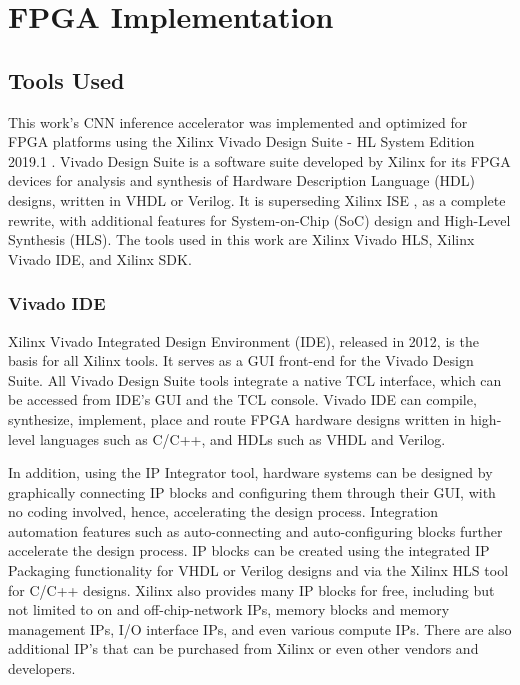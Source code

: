 \chapter{FPGA Implementation}
\label{Chapter-FPGA-Implementation}

\section{Tools Used}
This work's CNN inference accelerator was implemented and optimized for FPGA platforms using the Xilinx Vivado Design Suite - HL System Edition 2019.1 \cite{Vivado-Design-Suite}. Vivado Design Suite is a software suite developed by Xilinx for its FPGA devices for analysis and synthesis of Hardware Description Language (HDL) designs, written in VHDL or Verilog. It is superseding Xilinx ISE \cite{Xilinx-ISE}, as a complete rewrite, with additional features for System-on-Chip (SoC) design and High-Level Synthesis (HLS). The tools used in this work are Xilinx Vivado HLS, Xilinx Vivado IDE, and Xilinx SDK.

\subsection{Vivado IDE}
Xilinx Vivado Integrated Design Environment (IDE), released in 2012, is the basis for all Xilinx tools. It serves as a GUI front-end for the Vivado Design Suite. All Vivado Design Suite tools integrate a native TCL interface, which can be accessed from IDE's GUI and the TCL console. Vivado IDE can compile, synthesize, implement, place and route FPGA hardware designs written in high-level languages such as C/C++, and HDLs such as VHDL and Verilog.

In addition, using the IP Integrator tool, hardware systems can be designed by graphically connecting IP blocks and configuring them through their GUI, with no coding involved, hence, accelerating the design process. Integration automation features such as auto-connecting and auto-configuring blocks further accelerate the design process. IP blocks can be created using the integrated IP Packaging functionality for VHDL or Verilog designs and via the Xilinx HLS tool for C/C++ designs. Xilinx also provides many IP blocks for free, including but not limited to on and off-chip-network IPs, memory blocks and memory management IPs, I/O interface IPs, and even various compute IPs. There are also additional IP's that can be purchased from Xilinx or even other vendors and developers.

